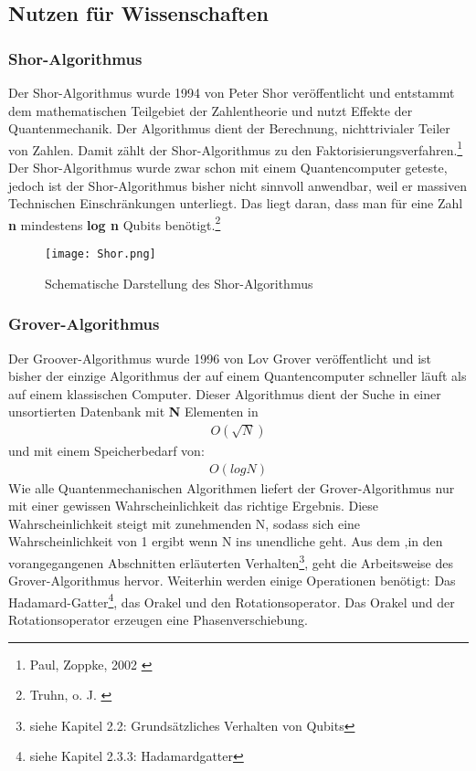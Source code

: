 \documentclass[12pt]{report}
\begin{document}
 \subsection{Nutzen für Wissenschaften}

 	\subsubsection{Shor-Algorithmus}
 	
 	Der Shor-Algorithmus wurde 1994 von Peter Shor veröffentlicht und entstammt dem mathematischen Teilgebiet der Zahlentheorie und nutzt Effekte der Quantenmechanik. Der Algorithmus dient der Berechnung, nichttrivialer Teiler von Zahlen. Damit zählt der Shor-Algorithmus zu den Faktorisierungsverfahren.\footnote{Paul, Zoppke, 2002 \cite{j341-1}} Der Shor-Algorithmus wurde zwar schon mit einem Quantencomputer geteste, jedoch ist der Shor-Algorithmus bisher nicht sinnvoll anwendbar, weil er massiven Technischen Einschränkungen unterliegt. Das liegt daran, dass man für eine Zahl \textbf{n} mindestens \textbf{log n} Qubits benötigt.\footnote{Truhn, o. J. \cite{j341-2}} 
 	

 	\begin{figure}[h]
\centering
	\texttt{[image: Shor.png]}
 	 \caption{
 	 Schematische Darstellung des Shor-Algorithmus
 	 }
 
\end{figure}



 	\subsubsection{Grover-Algorithmus}
 
Der Groover-Algorithmus wurde 1996 von Lov Grover veröffentlicht und ist bisher der einzige Algorithmus der auf einem Quantencomputer schneller läuft als auf einem klassischen Computer. Dieser Algorithmus dient der Suche in einer unsortierten Datenbank mit \textbf{N} Elementen in \begin{align*}
O\left( \sqrt{ N } \right)
\end{align*} und mit einem Speicherbedarf von: \begin{align*}
O\left( log N \right)
\end{align*} 
Wie alle Quantenmechanischen Algorithmen liefert der Grover-Algorithmus nur mit einer gewissen Wahrscheinlichkeit das richtige Ergebnis. Diese Wahrscheinlichkeit steigt mit zunehmenden N, sodass sich eine Wahrscheinlichkeit von 1 ergibt wenn N ins unendliche geht. Aus dem ,in den vorangegangenen Abschnitten erläuterten Verhalten\footnote{siehe Kapitel 2.2: Grundsätzliches Verhalten von Qubits}, geht die Arbeitsweise des Grover-Algorithmus hervor. Weiterhin werden einige Operationen benötigt: Das Hadamard-Gatter\footnote{siehe Kapitel 2.3.3: Hadamardgatter}, das Orakel und den Rotationsoperator. Das Orakel und der Rotationsoperator erzeugen eine Phasenverschiebung.
\end{document}
